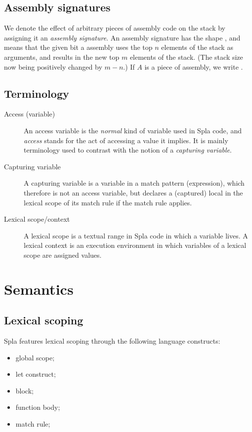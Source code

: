 \documentclass[english,10pt]{article} %
\theoremstyle{definitionstyle}
\theoremstyle{lemmastyle}
\begin{document}
\subsection{Assembly signatures}

We denote the effect of arbitrary pieces of assembly code on the stack by assigning it an \emph{assembly signature}. An assembly signature has the shape , and means that the given bit a assembly uses the top $n$ elements of the stack as arguments, and results in the new top $m$ elements of the stack. (The stack size now being positively changed by $m-n$.) If $A$ is a piece of assembly, we write .


\subsection{Terminology}

\begin{description}
\item[Access (variable)] An access variable is the \emph{normal} kind of variable used in Spla code, and \emph{access} stands for the act of accessing a value it implies. It is mainly terminology used to contrast with the notion of a \emph{capturing variable}.
\item[Capturing variable] A capturing variable is a variable in a match pattern (expression), which therefore is not an access variable, but declares a (captured) local in the lexical scope of its match rule if the match rule applies.
\item[Lexical scope/context] A lexical scope is a textual range in Spla code in which a variable lives. A lexical context is an execution environment in which variables of a lexical scope are assigned values.
\end{description}


\section{Semantics}


\subsection{Lexical scoping}

Spla features lexical scoping through the following language constructs:
\begin{itemize}
\item global scope;
\item let construct;
\item block;
\item function body;
\item match rule;
\end{itemize}
\end{document}
